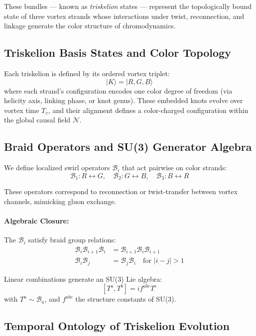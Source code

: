 \documentclass[12pt]{article}
\begin{document}
These bundles — known as \textit{triskelion} states — represent the topologically bound state of three vortex strands whose interactions under twist, reconnection, and linkage generate the color structure of chromodynamics.

\subsection*{Triskelion Basis States and Color Topology}

Each triskelion is defined by its ordered vortex triplet:
\[
|K\rangle = |R, G, B\rangle
\]
where each strand’s configuration encodes one color degree of freedom (via helicity axis, linking phase, or knot genus). These embedded knots evolve over vortex time \( T_v \), and their alignment defines a color-charged configuration within the global causal field \( \mathcal{N} \).

\subsection*{Braid Operators and SU(3) Generator Algebra}

We define localized swirl operators \( \mathcal{B}_i \) that act pairwise on color strands:
\[
\mathcal{B}_1 : R \leftrightarrow G, \quad
\mathcal{B}_2 : G \leftrightarrow B, \quad
\mathcal{B}_3 : B \leftrightarrow R
\]

These operators correspond to reconnection or twist-transfer between vortex channels, mimicking gluon exchange.

\paragraph{Algebraic Closure:}
The $\mathcal{B}_i$ satisfy braid group relations:
\begin{align}
\mathcal{B}_i \mathcal{B}_{i+1} \mathcal{B}_i &= \mathcal{B}_{i+1} \mathcal{B}_i \mathcal{B}_{i+1} \\
\mathcal{B}_i \mathcal{B}_j &= \mathcal{B}_j \mathcal{B}_i \quad \text{for } |i-j| > 1
\end{align}

Linear combinations generate an SU(3) Lie algebra:
\[
[T^a, T^b] = i f^{abc} T^c
\]
with \( T^a \sim \mathcal{B}_a \), and \( f^{abc} \) the structure constants of SU(3).

\subsection*{Temporal Ontology of Triskelion Evolution}
\end{document}
